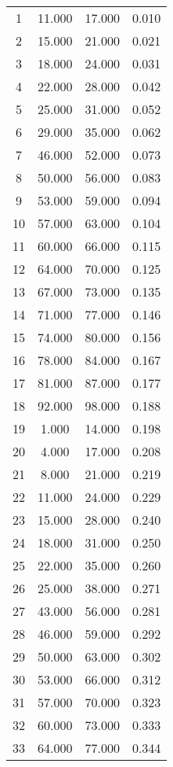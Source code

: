 % 
\begin{tabular}{cccc}
  \hline
  \hline
1 & 11.000 & 17.000 & 0.010 \\ 
  2 & 15.000 & 21.000 & 0.021 \\ 
  3 & 18.000 & 24.000 & 0.031 \\ 
  4 & 22.000 & 28.000 & 0.042 \\ 
  5 & 25.000 & 31.000 & 0.052 \\ 
  6 & 29.000 & 35.000 & 0.062 \\ 
  7 & 46.000 & 52.000 & 0.073 \\ 
  8 & 50.000 & 56.000 & 0.083 \\ 
  9 & 53.000 & 59.000 & 0.094 \\ 
  10 & 57.000 & 63.000 & 0.104 \\ 
  11 & 60.000 & 66.000 & 0.115 \\ 
  12 & 64.000 & 70.000 & 0.125 \\ 
  13 & 67.000 & 73.000 & 0.135 \\ 
  14 & 71.000 & 77.000 & 0.146 \\ 
  15 & 74.000 & 80.000 & 0.156 \\ 
  16 & 78.000 & 84.000 & 0.167 \\ 
  17 & 81.000 & 87.000 & 0.177 \\ 
  18 & 92.000 & 98.000 & 0.188 \\ 
  19 & 1.000 & 14.000 & 0.198 \\ 
  20 & 4.000 & 17.000 & 0.208 \\ 
  21 & 8.000 & 21.000 & 0.219 \\ 
  22 & 11.000 & 24.000 & 0.229 \\ 
  23 & 15.000 & 28.000 & 0.240 \\ 
  24 & 18.000 & 31.000 & 0.250 \\ 
  25 & 22.000 & 35.000 & 0.260 \\ 
  26 & 25.000 & 38.000 & 0.271 \\ 
  27 & 43.000 & 56.000 & 0.281 \\ 
  28 & 46.000 & 59.000 & 0.292 \\ 
  29 & 50.000 & 63.000 & 0.302 \\ 
  30 & 53.000 & 66.000 & 0.312 \\ 
  31 & 57.000 & 70.000 & 0.323 \\ 
  32 & 60.000 & 73.000 & 0.333 \\ 
  33 & 64.000 & 77.000 & 0.344 \\ 

\end{tabular}
